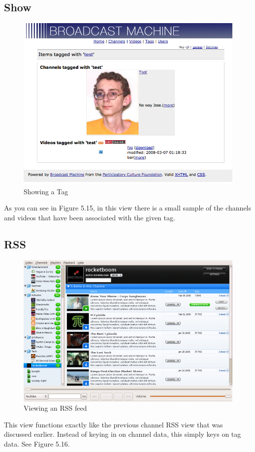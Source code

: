 \documentclass[a4paper,12pt]{report}
\begin{document}
\subsection{Show}
\begin{figure}[htp]
\begin{center}
\includegraphics[width=150mm]{./images/tagshow.png}
\end{center}
\caption{Showing a Tag}
\end{figure}

As you can see in Figure 5.15, in this view there is a small sample of the channels and videos that have been associated with the given tag.

\subsection{RSS}
\begin{figure}[htp]
\begin{center}
\includegraphics[width=150mm]{./images/channelrss.png}
\end{center}
\caption{Viewing an RSS feed}
\end{figure}
This view functions exactly like the previous channel RSS view that was discussed earlier.
Instead of keying in on channel data, this simply keys on tag data. See Figure 5.16.
\end{document}
